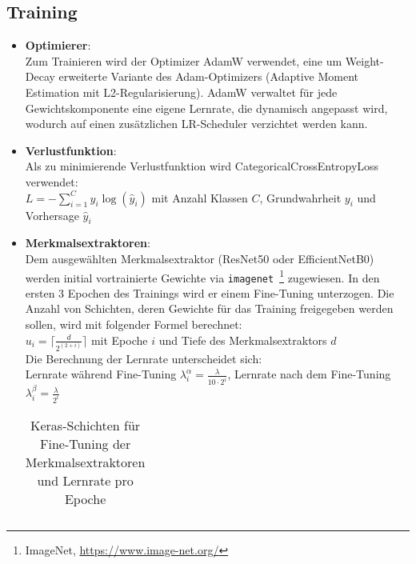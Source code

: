 \documentclass{article}
\newcommand{\resnet}{ResNet50\xspace}
\newcommand{\effnet}{EfficientNetB0\xspace}
\begin{document}
    \subsection{Training}
    \begin{itemize}
        \item\textbf{Optimierer}:
            \\Zum Trainieren wird der Optimizer AdamW verwendet, eine um Weight-Decay erweiterte Variante des Adam-Optimizers (Adaptive Moment Estimation mit L2-Regularisierung).
            AdamW verwaltet für jede Gewichtskomponente eine eigene Lernrate, die dynamisch angepasst wird, wodurch auf einen zusätzlichen LR-Scheduler verzichtet werden kann.
        \item\textbf{Verlustfunktion}:
            \\Als zu minimierende Verlustfunktion wird CategoricalCrossEntropyLoss verwendet:
            \\$\displaystyle L=-\sum_{i=1}^Cy_i\log(\hat y_i)$ mit Anzahl Klassen $C$, Grundwahrheit $y_i$ und Vorhersage $\hat y_i$
        \item\textbf{Merkmalsextraktoren}:
            \\Dem ausgewählten Merkmalsextraktor (\resnet oder \effnet) werden initial vortrainierte Gewichte via \texttt{imagenet}~\footnote{ImageNet, \url{https://www.image-net.org/}} zugewiesen.
            In den ersten 3 Epochen des Trainings wird er einem Fine-Tuning unterzogen.
            Die Anzahl von Schichten, deren Gewichte für das Training freigegeben werden sollen, wird mit folgender Formel berechnet:
            \\$\displaystyle u_i=\Big\lceil\frac{d}{2^{(2+i)}}\Big\rceil$ mit Epoche $i$ und Tiefe des Merkmalsextraktors $d$
            \\Die Berechnung der Lernrate unterscheidet sich:
            \\Lernrate während Fine-Tuning $\displaystyle \lambda^\alpha_i=\frac{\lambda}{10\cdot 2^i}$, Lernrate nach dem Fine-Tuning $\displaystyle \lambda^\beta_i=\frac{\lambda}{2^i}$
            \\
            \begin{table}[!h]
                \centering
                \caption{Keras-Schichten für Fine-Tuning der Merkmalsextraktoren und Lernrate pro Epoche}
                \begin{tabularx}{\textwidth}{|X||c|c||c|}

\end{tabularx}
\end{table}
\end{itemize}
\end{document}
